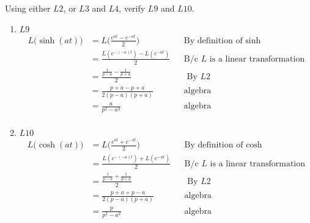 \item [3.] Using either $L2$, or $L3$ and $L4$, verify $L9$ and $L10$.
\begin{enumerate}
    \item [] $L9$
    \begin{align*}
    L\big(\sinh(at)\big) &= L \Bigg(\frac{e^{at}-e^{-at}}{2}\Bigg) && \text{By definition of } \sinh\\
    &= \frac{L(e^{-(-a)t})-L(e^{-at})}{2} && \text{B/c $L$ is a linear transformation}\\
    &=\frac{\frac{1}{p-a}-\frac{1}{p+a}}{2} &&\text{ By } L2\\
    &=\frac{p+a-p+a}{2(p-a)(p+a)} &&\text{algebra}\\
    &=\frac{a}{p^2-a^2} &&\text{algebra}\\
    \end{align*}
    \item [] $L10$
    \begin{align*}
    L\big(\cosh(at)\big) &= L \Bigg(\frac{e^{at}+e^{-at}}{2}\Bigg) && \text{By definition of } \cosh\\
    &= \frac{L(e^{-(-a)t})+L(e^{-at})}{2} && \text{B/c $L$ is a linear transformation}\\
    &=\frac{\frac{1}{p-a}+\frac{1}{p+a}}{2} &&\text{ By } L2\\
    &=\frac{p+a+p-a}{2(p-a)(p+a)} &&\text{algebra}\\
    &=\frac{p}{p^2-a^2} &&\text{algebra}\\
    \end{align*}
\end{enumerate}
